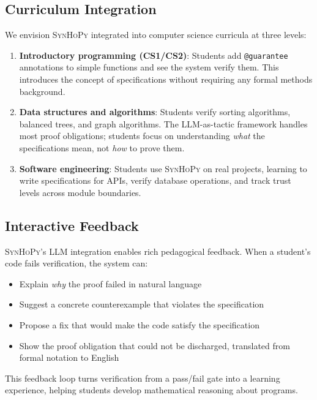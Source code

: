 \documentclass[11pt,a4paper]{report}
\theoremstyle{definition}
\theoremstyle{plain}
\newcommand{\synhopy}{\textsc{SynHoPy}}
\begin{document}
\subsection{Curriculum Integration}

We envision \synhopy{} integrated into computer science curricula at
three levels:

\begin{enumerate}
  \item \textbf{Introductory programming (CS1/CS2)}: Students add
    \lstinline[style=synhopy]{@guarantee} annotations to simple functions
    and see the system verify them.  This introduces the concept of
    specifications without requiring any formal methods background.

  \item \textbf{Data structures and algorithms}: Students verify
    sorting algorithms, balanced trees, and graph algorithms.  The
    LLM-as-tactic framework handles most proof obligations; students
    focus on understanding \emph{what} the specifications mean, not
    \emph{how} to prove them.

  \item \textbf{Software engineering}: Students use \synhopy{} on
    real projects, learning to write specifications for APIs, verify
    database operations, and track trust levels across module boundaries.
\end{enumerate}

\subsection{Interactive Feedback}

\synhopy{}'s LLM integration enables rich pedagogical feedback.  When
a student's code fails verification, the system can:
\begin{itemize}
  \item Explain \emph{why} the proof failed in natural language
  \item Suggest a concrete counterexample that violates the specification
  \item Propose a fix that would make the code satisfy the specification
  \item Show the proof obligation that could not be discharged, translated
    from formal notation to English
\end{itemize}

This feedback loop turns verification from a pass/fail gate into a
learning experience, helping students develop mathematical reasoning
about programs.
\end{document}
